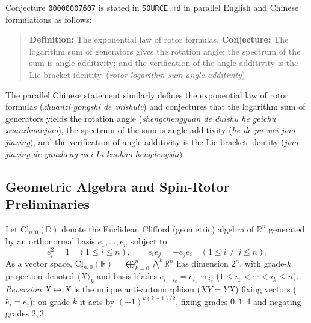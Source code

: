 \documentclass[11pt]{article}
\theoremstyle{definition}
\newcommand{\Cl}{\mathrm{Cl}}
\newcommand{\rev}[1]{\widetilde{#1}}
\newcommand{\grade}[2]{\langle #1 \rangle_{#2}}
\begin{document}
Conjecture \texttt{00000007607} is stated in \texttt{SOURCE.md} in parallel English and
Chinese formulations as follows:
\begin{quote}
\textbf{Definition:} The exponential law of rotor formulas. \textbf{Conjecture:} The
logarithm sum of generators gives the rotation angle; the spectrum of the sum is angle
additivity; and the verification of the angle additivity is the Lie bracket identity.
(\emph{rotor logarithm-sum angle additivity})
\end{quote}
The parallel Chinese statement similarly defines the exponential law of rotor formulas
(\emph{zhuanzi gongshi de zhishulv}) and conjectures that the logarithm sum of generators
yields the rotation angle (\emph{shengchengyuan de duishu he geichu xuanzhuanjiao}), the
spectrum of the sum is angle additivity (\emph{he de pu wei jiao jiaxing}), and the
verification of angle additivity is the Lie bracket identity (\emph{jiao jiaxing de yanzheng
wei Li kuohao hengdengshi}).

\subsection{Geometric Algebra and Spin-Rotor Preliminaries}

Let $\Cl_{n,0}(\mathbb{R})$ denote the Euclidean Clifford (geometric) algebra of $\mathbb{R}^n$
generated by an orthonormal basis $e_1, \dots, e_n$ subject to
\begin{equation}
  e_i^2 = 1 \quad (1 \le i \le n), \qquad
  e_i e_j = -e_j e_i \quad (1 \le i \neq j \le n).
\end{equation}
As a vector space, $\Cl_{n,0}(\mathbb{R}) = \bigoplus_{k=0}^n \bigwedge^k \mathbb{R}^n$ has
dimension $2^n$, with grade-$k$ projection denoted $\grade{X}{k}$ and basis blades
$e_{i_1 \cdots i_k} = e_{i_1} \cdots e_{i_k}$ ($1 \le i_1 < \cdots < i_k \le n$).
\emph{Reversion} $X \mapsto \rev{X}$ is the unique anti-automorphism ($\rev{XY} = \rev{Y}\rev{X}$)
fixing vectors ($\rev{e_i} = e_i$); on grade $k$ it acts by $(-1)^{k(k-1)/2}$, fixing grades
$0, 1, 4$ and negating grades $2, 3$.
\end{document}
